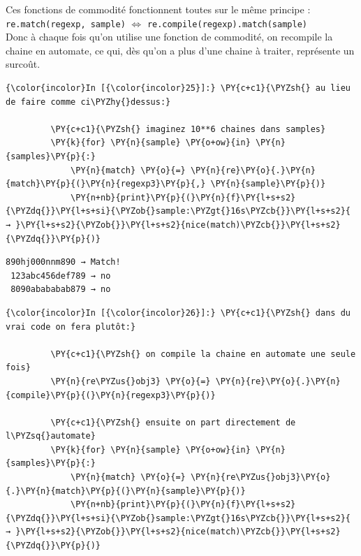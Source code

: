 Ces fonctions de commodité fonctionnent toutes sur le même principe :\\

\texttt{re.match(regexp,\ sample)} \(\Longleftrightarrow\)
\texttt{re.compile(regexp).match(sample)}\\

Donc à chaque fois qu'on utilise une fonction de commodité, on recompile
la chaine en automate, ce qui, dès qu'on a plus d'une chaine à traiter,
représente un surcoût.

    \begin{Verbatim}[commandchars=\\\{\}]
{\color{incolor}In [{\color{incolor}25}]:} \PY{c+c1}{\PYZsh{} au lieu de faire comme ci\PYZhy{}dessus:}
         
         \PY{c+c1}{\PYZsh{} imaginez 10**6 chaines dans samples}
         \PY{k}{for} \PY{n}{sample} \PY{o+ow}{in} \PY{n}{samples}\PY{p}{:}
             \PY{n}{match} \PY{o}{=} \PY{n}{re}\PY{o}{.}\PY{n}{match}\PY{p}{(}\PY{n}{regexp3}\PY{p}{,} \PY{n}{sample}\PY{p}{)}
             \PY{n+nb}{print}\PY{p}{(}\PY{n}{f}\PY{l+s+s2}{\PYZdq{}}\PY{l+s+si}{\PYZob{}sample:\PYZgt{}16s\PYZcb{}}\PY{l+s+s2}{ → }\PY{l+s+s2}{\PYZob{}}\PY{l+s+s2}{nice(match)\PYZcb{}}\PY{l+s+s2}{\PYZdq{}}\PY{p}{)}    
\end{Verbatim}


    \begin{Verbatim}[commandchars=\\\{\}]
  890hj000nnm890 → Match!
 123abc456def789 → no
 8090abababab879 → no

    \end{Verbatim}

    \begin{Verbatim}[commandchars=\\\{\}]
{\color{incolor}In [{\color{incolor}26}]:} \PY{c+c1}{\PYZsh{} dans du vrai code on fera plutôt:}
         
         \PY{c+c1}{\PYZsh{} on compile la chaine en automate une seule fois}
         \PY{n}{re\PYZus{}obj3} \PY{o}{=} \PY{n}{re}\PY{o}{.}\PY{n}{compile}\PY{p}{(}\PY{n}{regexp3}\PY{p}{)}
         
         \PY{c+c1}{\PYZsh{} ensuite on part directement de l\PYZsq{}automate}
         \PY{k}{for} \PY{n}{sample} \PY{o+ow}{in} \PY{n}{samples}\PY{p}{:}
             \PY{n}{match} \PY{o}{=} \PY{n}{re\PYZus{}obj3}\PY{o}{.}\PY{n}{match}\PY{p}{(}\PY{n}{sample}\PY{p}{)}
             \PY{n+nb}{print}\PY{p}{(}\PY{n}{f}\PY{l+s+s2}{\PYZdq{}}\PY{l+s+si}{\PYZob{}sample:\PYZgt{}16s\PYZcb{}}\PY{l+s+s2}{ → }\PY{l+s+s2}{\PYZob{}}\PY{l+s+s2}{nice(match)\PYZcb{}}\PY{l+s+s2}{\PYZdq{}}\PY{p}{)}
\end{Verbatim}


